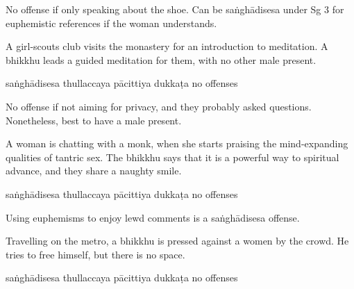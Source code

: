 \begin{exam}{\autoExamName}
\begin{problem*}
\begin{parts}
  \bigskip

  \begin{solution}
    No offense if only speaking about the shoe.
    Can be saṅghādisesa under Sg 3 for euphemistic references if the woman understands.
  \end{solution}

  \item A girl-scouts club visits the monastery for an introduction to
    meditation. A bhikkhu leads a guided meditation for them, with no other male
    present.

    \bigskip

    \begin{answers}{5}
      \bChoices
       saṅghādisesa\eAns
       thullaccaya\eAns
       pācittiya\eAns
       dukkaṭa\eAns
       no offenses\eAns
      \eChoices
    \end{answers}

    \begin{solution}
      No offense if not aiming for privacy, and they probably asked questions.
      Nonetheless, best to have a male present.
    \end{solution}

    \bigskip

  \item A woman is chatting with a monk, when she starts praising the
    mind-expanding qualities of tantric sex. The bhikkhu says that it is a
    powerful way to spiritual advance, and they share a naughty smile.

    \bigskip

    \begin{answers}{5}
      \bChoices
       saṅghādisesa\eAns
       thullaccaya\eAns
       pācittiya\eAns
       dukkaṭa\eAns
       no offenses\eAns
      \eChoices
    \end{answers}

    \begin{solution}
      Using euphemisms to enjoy lewd comments is a saṅghādisesa offense.
    \end{solution}

    \bigskip

  \item Travelling on the metro, a bhikkhu is pressed against a women by the
    crowd. He tries to free himself, but there is no space.

    \bigskip

    \begin{answers}{5}
      \bChoices
       saṅghādisesa\eAns
       thullaccaya\eAns
       pācittiya\eAns
       dukkaṭa\eAns
       no offenses\eAns
      \eChoices
    \end{answers}


\end{parts}
\end{problem*}
\end{exam}
